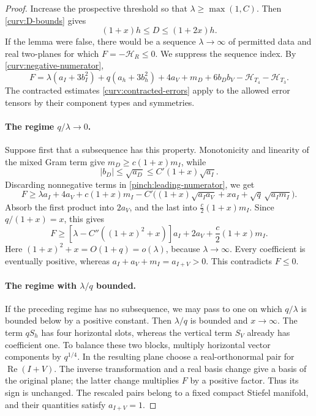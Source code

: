 \begin{proof}
Increase the prospective threshold so that \(\lambda\ge\max(1,C)\).
Then \eqref{curv:D-bounds} gives
\[
 (1+x)h\le D\le(1+2x)h.
\]
If the lemma were false, there would be a sequence
\(\lambda\to\infty\) of permitted data and real two-planes for which
\(F=-\mathcal H_R\le0\).
We suppress the sequence index.
By \eqref{curv:negative-numerator},
\begin{equation}\label{pinch:leading-numerator}
 F=\lambda(a_I+3b_I^2)+q(a_h+3b_h^2)+4a_V
 +m_D+6b_Db_V-\mathcal H_{T_4}-\mathcal H_{T_3}.
\end{equation}
The contracted estimates \eqref{curv:contracted-errors} apply to the
allowed error tensors by their component types and symmetries.

\paragraph{The regime \(q/\lambda\to0\).}
Suppose first that a subsequence has this property.
Monotonicity and linearity of the mixed Gram term give
\(m_D\ge c(1+x)m_I\), while
\[
 |b_D|\le\sqrt{a_D}\le C'(1+x)\sqrt{a_I}.
\]
Discarding nonnegative terms in \eqref{pinch:leading-numerator}, we get
\[
 F\ge\lambda a_I+4a_V+c(1+x)m_I
 -C'\bigl((1+x)\sqrt{a_Ia_V}+x a_I+
             \sqrt q\,\sqrt{a_Im_I}\bigr).
\]
Absorb the first product into \(2a_V\), and the last into
\(\frac c2(1+x)m_I\).  Since \(q/(1+x)=x\), this gives
\[
 F\ge[\lambda-C''((1+x)^2+x)]a_I+
 2a_V+\frac c2(1+x)m_I.
\]
Here \((1+x)^2+x=O(1+q)=o(\lambda)\), because \(\lambda\to\infty\).
Every coefficient is eventually positive, whereas
\(a_I+a_V+m_I=a_{I+V}>0\).  This contradicts \(F\le0\).

\paragraph{The regime with \(\lambda/q\) bounded.}
If the preceding regime has no subsequence, we may pass to one on
which \(q/\lambda\) is bounded below by a positive constant.
Then \(\lambda/q\) is bounded and \(x\to\infty\).
The term \(qS_h\) has four horizontal slots, whereas the vertical
term \(S_V\) already has coefficient one.  To balance these two blocks,
multiply horizontal vector components by \(q^{1/4}\).
In the resulting plane choose a real-orthonormal pair for
\(\operatorname{Re}(I+V)\).
The inverse transformation and a real basis change give a basis of
the original plane; the latter change multiplies \(F\) by a positive
factor.
Thus its sign is unchanged.
The rescaled pairs belong to a fixed compact Stiefel manifold, and
their quantities satisfy \(a_{I+V}=1\).


\end{proof}
